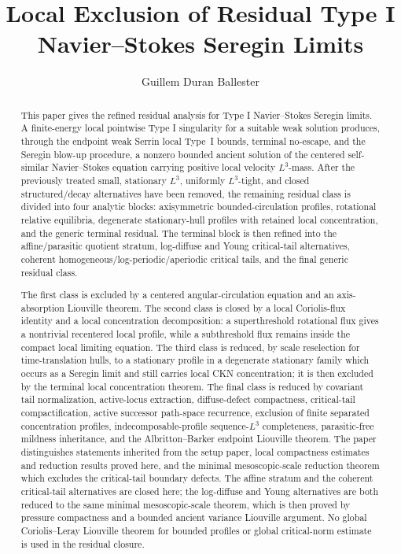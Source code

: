 \documentclass[11pt]{amsart}
\title[Residual Type I Seregin limit exclusion]
{Local Exclusion of Residual Type I Navier--Stokes Seregin Limits}
\author{Guillem Duran Ballester}
\date{}
\numberwithin{equation}{section}
\theoremstyle{plain}
\theoremstyle{definition}
\theoremstyle{remark}
\begin{document}
\begin{abstract}
This paper gives the refined residual analysis for Type I
Navier--Stokes Seregin limits.  A finite-energy local pointwise Type I
singularity for a suitable weak solution produces, through the endpoint weak
Serrin local Type~I bounds, terminal no-escape, and the Seregin blow-up
procedure, a nonzero bounded ancient solution of the centered self-similar
Navier--Stokes equation carrying positive local velocity \(L^3\)-mass.  After the
previously treated small, stationary \(L^3\), uniformly \(L^3\)-tight, and
closed structured/decay alternatives have been removed, the remaining
residual class is divided into four analytic blocks: axisymmetric
bounded-circulation profiles, rotational relative equilibria, degenerate
stationary-hull profiles with retained local concentration, and the generic
terminal residual.  The terminal block is then refined into the
affine/parasitic quotient stratum, log-diffuse and Young critical-tail
alternatives, coherent homogeneous/log-periodic/aperiodic critical tails, and
the final generic residual class.

The first class is excluded by a centered angular-circulation equation and an
axis-absorption Liouville theorem.  The second class is closed by a local
Coriolis-flux identity and a local concentration decomposition: a superthreshold
rotational flux gives a nontrivial recentered local profile, while a subthreshold flux
remains inside the compact local limiting equation.  The third class is
reduced, by scale reselection for time-translation hulls, to a stationary
profile in a degenerate stationary family which occurs as a Seregin limit
and still carries local CKN concentration; it is then excluded by the terminal
local concentration theorem.  The final class is reduced by covariant tail
normalization, active-locus extraction, diffuse-defect compactness, critical-tail
compactification, active successor path-space recurrence, exclusion of finite
separated concentration profiles, indecomposable-profile sequence-\(L^3\)
completeness, parasitic-free mildness inheritance, and the Albritton--Barker
endpoint Liouville theorem.  The paper distinguishes statements inherited from
the setup paper, local compactness estimates and reduction results
proved here, and the minimal mesoscopic-scale reduction theorem which
excludes the critical-tail boundary defects.  The affine stratum and the coherent
critical-tail alternatives are closed here; the log-diffuse and Young
alternatives are both reduced to the same minimal mesoscopic-scale theorem, which is then
proved by pressure compactness and a bounded ancient variance Liouville
argument.  No global
Coriolis--Leray Liouville theorem for bounded profiles or global critical-norm
estimate is used in the residual closure.
\end{abstract}
\end{document}

